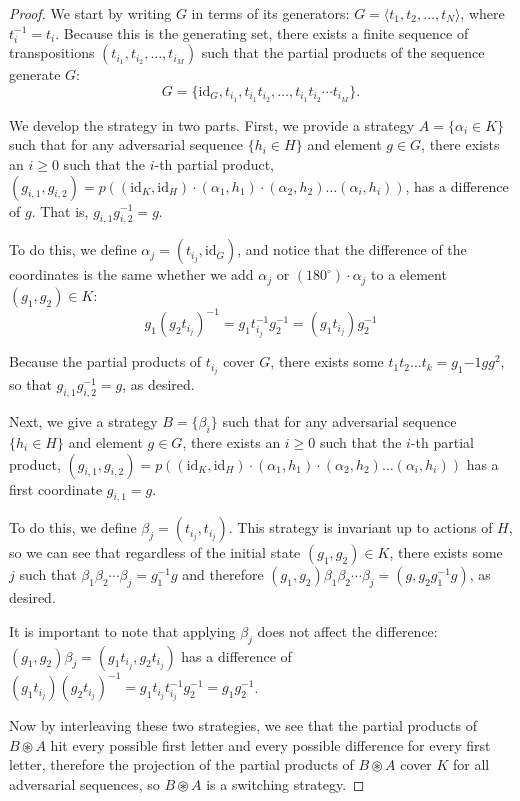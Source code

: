 \begin{proof}
  We start by writing $G$ in terms of its generators:
  $G = \langle t_1, t_2, \dots, t_N\rangle$, where $t_i^{-1} = t_i$.
  Because this is the generating set, there exists a finite sequence of
  transpositions $(t_{i_1}, t_{i_2}, \dots, t_{i_M})$
  such that the partial products of the sequence generate $G$: \[
    G = \{\mathrm{id}_G, t_{i_1}, t_{i_1}t_{i_2}, \dots, t_{i_1}t_{i_2}\cdots t_{i_M}\}.
  \]

  We develop the strategy in two parts. First, we provide a strategy
  $A = \{\alpha_i \in K\}$ such that for any adversarial sequence $\{h_i \in H\}$
  and element $g \in G$, there exists an $i \geq 0$
  such that the {$i$-th} partial product,
  $(g_{i,1}, g_{i,2}) = p((\mathrm{id}_K, \mathrm{id}_H)\cdot(\alpha_1, h_1)\cdot(\alpha_2, h_2)\dots(\alpha_i, h_i))$,
  has a difference of $g$. That is, $g_{i,1}g_{i,2}^{-1} = g$.

  To do this, we define $\alpha_j = (t_{i_j}, \mathrm{id}_G)$,
  and notice that the difference of the coordinates is the same whether we
  add $\alpha_j$ or $(180^\circ)\cdot \alpha_j$ to a element
  $(g_1, g_2) \in K$: \[
    g_1(g_2t_{i_j})^{-1} = g_1t_{i_j}^{-1}g_2^{-1} = (g_1t_{i_j})g_2^{-1}
  \]

  Because the partial products of $t_{i_j}$ cover $G$, there exists some
  $t_1 t_2\dots t_k = g_1{-1}gg^2$, so that $g_{i,1}g_{i,2}^{-1} = g$, as
  desired.

  Next, we give a strategy $B = \{\beta_i\}$ such that for any adversarial
  sequence $\{h_i \in H\}$ and element $g \in G$, there exists an $i \geq 0$
  such that the {$i$-th} partial product,
  $(g_{i,1}, g_{i,2}) = p((\mathrm{id}_K, \mathrm{id}_H)\cdot(\alpha_1, h_1)\cdot(\alpha_2, h_2)\dots(\alpha_i, h_i))$
  has a first coordinate $g_{i,1} = g$.

  To do this, we define $\beta_j = (t_{i_j}, t_{i_j})$. This strategy is
  invariant up to actions of $H$, so we can see that regardless of the initial
  state $(g_1, g_2) \in K$, there exists some $j$ such that
   $\beta_1 \beta_2 \cdots \beta_j = g_1^{-1}g$ and therefore
   $(g_1, g_2) \beta_1 \beta_2 \cdots \beta_j = (g, g_2g_1^{-1}g)$, as desired.

   It is important to note that applying $\beta_j$ does not affect the
   difference: $(g_1, g_2) \beta_j = (g_1t_{i_j}, g_2t_{i_j})$ has a
   difference of
   $(g_1t_{i_j})(g_2t_{i_j})^{-1} = g_1t_{i_j}t_{i_j}^{-1}g_2^{-1} = g_1g_2^{-1}$.

  Now by interleaving these two strategies, we see that the partial products
  of $B \circledast A$ hit every possible first letter and every possible
  difference for every first letter,
  therefore the projection of the partial products of
  $B \circledast A$ cover $K$ for all adversarial sequences, so
  $B \circledast A$ is a switching strategy.
\end{proof}
